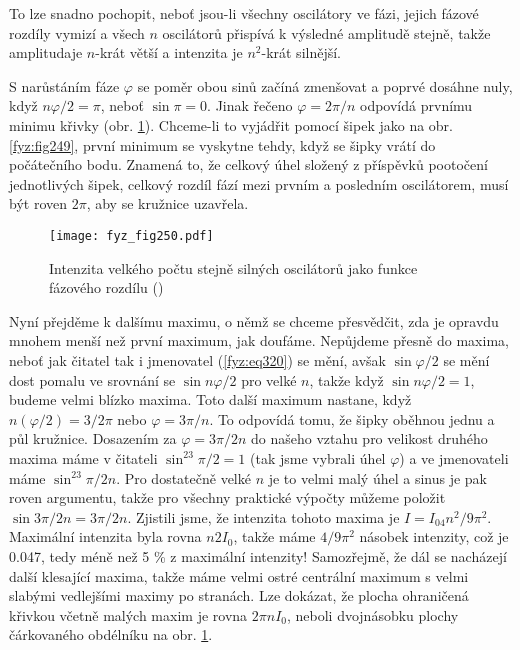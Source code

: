     To lze snadno pochopit, neboť jsou-li všechny oscilátory ve fázi, jejich fázové rozdíly vymizí 
    a všech \(n\) oscilátorů přispívá k výsledné amplitudě stejně, takže amplitudaje \(n\)-krát 
    větší a intenzita je \(n^2\)-krát silnější.
    
    S narůstáním fáze \(\varphi\) se poměr obou sinů začíná zmenšovat a poprvé dosáhne nuly, když 
    \(n\varphi/2 = \pi\), neboť \(\sin\pi = 0\). Jinak řečeno \(\varphi = 2\pi/n\) odpovídá prvnímu 
    minimu křivky (obr. \ref{fyz:fig250}). Chceme-li to vyjádřit pomocí šipek jako na obr. 
    \ref{fyz:fig249}, první minimum se vyskytne tehdy, když se šipky vrátí do počátečního bodu. 
    Znamená to, že celkový úhel složený z příspěvků pootočení jednotlivých šipek, celkový rozdíl 
    fází mezi prvním a posledním oscilátorem, musí být roven \(2\pi\), aby se kružnice uzavřela.

    \begin{figure}[ht!] %
      \centering
      \texttt{[image: fyz\_fig250.pdf]}
      \caption{Intenzita velkého počtu stejně silných oscilátorů jako funkce fázového rozdílu
               (\cite[s.~393]{Feynman01})}
      \label{fyz:fig250}
    \end{figure}
    
    Nyní přejděme k dalšímu maximu, o němž se chceme přesvědčit, zda je opravdu mnohem menší než 
    první maximum, jak doufáme. Nepůjdeme přesně do maxima, neboť jak čitatel tak i jmenovatel 
    (\ref{fyz:eq320}) se mění, avšak \(\sin\varphi/2\) se mění dost pomalu ve srovnání se \(\sin 
    n\varphi/2\) pro velké \(n\), takže když \(\sin n\varphi/2 = 1\), budeme velmi blízko maxima. 
    Toto další maximum nastane, když \(n(\varphi/2) = 3/2\pi\) nebo \(\varphi = 3\pi/n\). To 
    odpovídá tomu, že šipky oběhnou jednu a půl kružnice. Dosazením za \(\varphi = 3\pi/2n\) do 
    našeho vztahu pro velikost druhého maxima máme v čitateli \(\sin^23\pi/2 = 1\) (tak jsme 
    vybrali úhel \(\varphi\)) a ve jmenovateli máme \(\sin^23\pi/2n\). Pro dostatečně velké \(n\) 
    je to velmi malý úhel a sinus je pak roven argumentu, takže pro všechny praktické výpočty 
    můžeme položit \(\sin3\pi/2n = 3\pi/2n\). Zjistili jsme, že intenzita tohoto maxima je \(I = 
    I_04n^2/9\pi^2\). Maximální intenzita byla rovna \(n2I_0\), takže máme \(4/9\pi^2\) násobek 
    intenzity, což je \num{0.047}, tedy méně než 5 \% z maximální intenzity! Samozřejmě, že 
    dál se nacházejí další klesající maxima, takže máme velmi ostré centrální maximum s velmi 
    slabými vedlejšími maximy po stranách. Lze dokázat, že plocha ohraničená křivkou včetně malých 
    maxim je rovna \(2\pi nI_0\), neboli dvojnásobku plochy čárkovaného obdélníku na obr. 
    \ref{fyz:fig250}.

